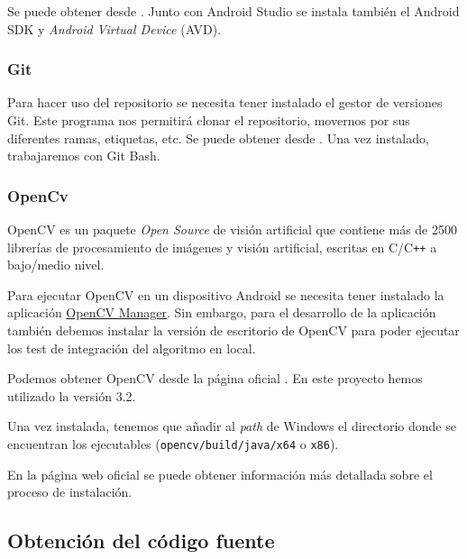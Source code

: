 Se puede obtener desde \citep{android:androidstudio}. Junto con Android
Studio se instala también el Android SDK y \emph{Android Virtual Device}
(AVD).


\subsubsection{Git}\label{git}

Para hacer uso del repositorio se necesita tener instalado el gestor de
versiones Git. Este programa nos permitirá clonar el repositorio,
movernos por sus diferentes ramas, etiquetas, etc. Se puede obtener
desde \citep{git:scm}. Una vez instalado, trabajaremos con Git
Bash.


\subsubsection{OpenCv}\label{opencv}

OpenCV es un paquete \emph{Open Source} de visión artificial que
contiene más de 2500 librerías de procesamiento de imágenes y visión
artificial, escritas en C/C\texttt{++} a bajo/medio nivel.

Para ejecutar OpenCV en un dispositivo Android se necesita tener
instalado la aplicación
\href{https://play.google.com/store/apps/details?id=org.opencv.engine}{OpenCV
Manager}. Sin embargo, para el desarrollo de la aplicación también
debemos instalar la versión de escritorio de OpenCV para poder ejecutar
los test de integración del algoritmo en local.

Podemos obtener OpenCV desde la página oficial \citep{opencv:web}. En
este proyecto hemos utilizado la versión 3.2.

Una vez instalada, tenemos que añadir al \emph{path} de Windows el
directorio donde se encuentran los ejecutables
(\texttt{opencv/build/java/x64} o \texttt{x86}).


En la página web oficial se puede obtener información más detallada
sobre el proceso de instalación.

\subsection{Obtención del código
fuente}\label{obtencion-del-codigo-fuente}


